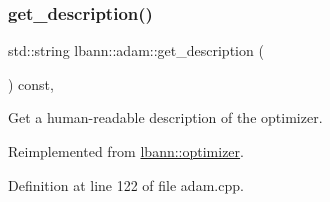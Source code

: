 \subsubsection{\texorpdfstring{get\+\_\+description()}{get\_description()}}
{\footnotesize\ttfamily std\+::string lbann\+::adam\+::get\+\_\+description (\begin{DoxyParamCaption}{ }\end{DoxyParamCaption}) const\hspace{0.3cm}{\ttfamily [override]}, {\ttfamily [virtual]}}

Get a human-\/readable description of the optimizer. 

Reimplemented from \hyperlink{classlbann_1_1optimizer_a66bb8d28dfb41452ac1a75a3efd47723}{lbann\+::optimizer}.



Definition at line 122 of file adam.\+cpp.


